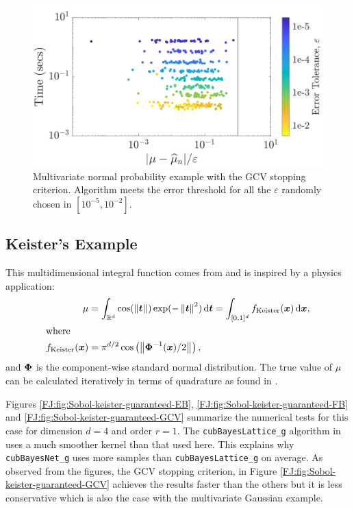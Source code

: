 \documentclass[graybox,footinfo]{svmult}
\newcommand{\norm}[2][{}]{\ensuremath{\left \lVert #2 \right \rVert}_{#1}}
\begin{document}
\begin{figure}
\centering
\includegraphics[width=0.95\linewidth]{"figures/Sobol/Sobol_MVN_guaranteed_time_GCV__d2_r1_2019-Sep-1"}
\caption[Sobol: MVN guaranteed: GCV]{Multivariate normal probability example with the GCV stopping criterion. Algorithm meets the error threshold for all the $\varepsilon$ randomly chosen in $[10^{-5}, 10^{-2}]$.}
\label{FJ:fig:Sobol-mvn-guaranteed-GCV}
\end{figure}






\subsection{Keister's Example}

This multidimensional integral function comes from \cite{Kei96} and is inspired by a physics application:
\begin{align}
\nonumber
\mu  &=  \int_{\R^d} \cos(\norm{ \bst}) \exp(-\norm{ \bst }^2) \, \textup{d}\bst 
 = \int_{[0,1]^d} f_{\textup{Keister}}(\bsx) \, \textup{d}\bsx,\\
\intertext{where }
\nonumber
f_\textup{Keister}(\bsx) &= \pi^{d/2} \cos\left(\norm{ \bsPhi^{-1}(\bsx)/2}\right)  ,
\end{align}
and ${\boldsymbol{\Phi}}$ is the component-wise standard normal distribution.
The true value of $\mu$ can be calculated iteratively in terms of  quadrature as found in \cite[Section 5.2]{RatHic19a}.


Figures \ref{FJ:fig:Sobol-keister-guaranteed-EB}, \ref{FJ:fig:Sobol-keister-guaranteed-FB} and \ref{FJ:fig:Sobol-keister-guaranteed-GCV} summarize the numerical tests for this case for dimension $d=4$ and order $r=1$.  The \texttt{cubBayesLattice\_g} algorithm in  \cite{RatHic19a} uses a much smoother kernel than that used here. This explains why \texttt{cubBayesNet\_g} uses more samples than  \texttt{cubBayesLattice\_g} on average. 
As observed from the figures, the GCV stopping criterion, in Figure \ref{FJ:fig:Sobol-keister-guaranteed-GCV} achieves the results faster than the others but it is less conservative which is also the case with the multivariate Gaussian example.
\end{document}
